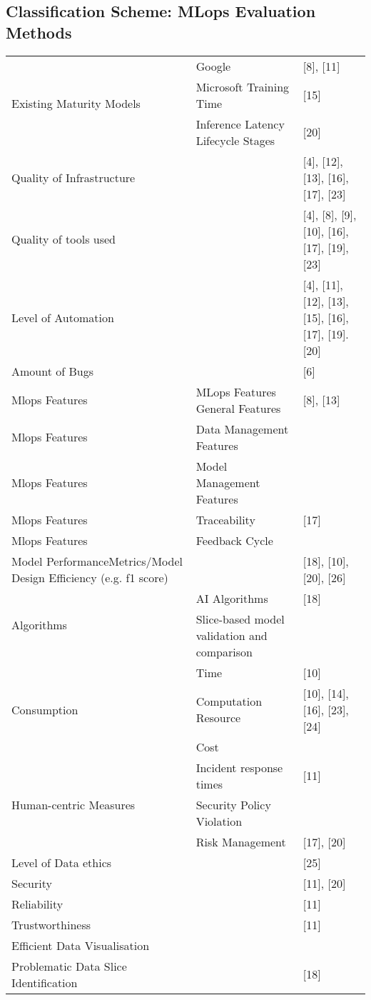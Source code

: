\subsection{Classification Scheme: MLops Evaluation Methods}

\begin{tabular}{|p{6cm}|p{6cm}|p{3cm}|}
  \hline
  \multirow{3}{*}{Existing Maturity Models} & Google & [8], [11] \\
  \cline{2-3}
  & Microsoft Training Time & [15] \\
  \cline{2-3}
  & Inference Latency Lifecycle Stages & [20] \\
  \hline
  Quality of Infrastructure & & [4], [12], [13], [16], [17], [23]\\
  \hline
  Quality of tools used & & [4], [8], [9], [10], [16], [17], [19], [23]\\
  \hline
  Level of Automation & & [4], [11], [12], [13], [15], [16], [17], [19]. [20]\\
  \hline
  Amount of Bugs & & [6]\\
  \hline
  Mlops Features & MLops Features General Features & [8], [13]\\
  \hline
  Mlops Features & Data Management Features &\\
  \hline
  Mlops Features & Model Management Features &\\
  \hline
  Mlops Features & Traceability & [17]\\
  \hline
  Mlops Features & Feedback Cycle &\\
  \hline
  Model PerformanceMetrics/Model Design Efficiency (e.g. f1 score) & &[18], [10], [20], [26]\\
  \hline
  \multirow{2}{*}{Algorithms} & AI Algorithms & [18]\\
  \cline{2-3}
  & Slice-based model validation and comparison & \\
  \hline
  \multirow{3}{*}{ Consumption } & Time & [10]\\
  \cline{2-3}
  & Computation Resource & [10], [14], [16], [23], [24]\\
  \cline{2-3}
  & Cost &\\
  \hline
  \multirow{3}{*}{ Human-centric Measures } & Incident response times & [11] \\
  \cline{2-3}
  & Security Policy Violation & \\
  \cline{2-3}
  & Risk Management & [17], [20] \\
  \hline
  Level of Data ethics & & [25]\\
  \hline
  Security & & [11], [20]\\
  \hline
  Reliability & & [11]\\
  \hline
  Trustworthiness & & [11]\\
  \hline
  Efficient Data Visualisation & &\\
  \hline
  Problematic Data Slice Identification & & [18]\\
  \hline
\end{tabular}

